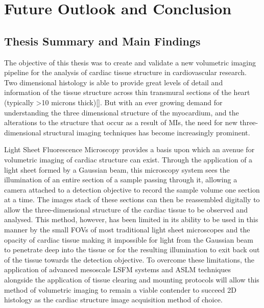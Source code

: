 \chapter{Future Outlook and Conclusion}

\section{Thesis Summary and Main Findings}
The objective of this thesis was to create and validate a new volumetric imaging pipeline for the analysis of cardiac tissue structure in cardiovascular research. Two dimensional histology is able to provide great levels of detail and information of the tissue structure across thin transmural sections of the heart (typically >10 microns thick)[]. But with an ever growing demand for understanding the three dimensional structure of the myocardium, and the alterations to the structure that occur as a result of MIs, the need for new three-dimensional structural imaging techniques has become increasingly prominent. 

Light Sheet Fluorescence Microscopy provides a basis upon which an avenue for volumetric imaging of cardiac structure can exist. Through the application of a light sheet formed by a Gaussian beam, this microscopy system sees the illumination of an entire section of a sample passing through it, allowing a camera attached to a detection objective to record the sample volume one section at a time. The images stack of these sections can then be reassembled digitally to allow the three-dimensional structure of the cardiac tissue to be observed and analysed. This method, however, has been limited in its ability to be used in this manner by the small FOVs of most traditional light sheet microscopes and the opacity of cardiac tissue making it impossible for light from the Gaussian beam to penetrate deep into the tissue or for the resulting illumination to exit back out of the tissue towards the detection objective. To overcome these limitations, the application of advanced mesoscale LSFM systems and ASLM techniques alongside the application of tissue clearing and mounting protocols will allow this method of volumetric imaging to remain a viable contender to succeed 2D histology as the cardiac structure image acquisition method of choice.  

